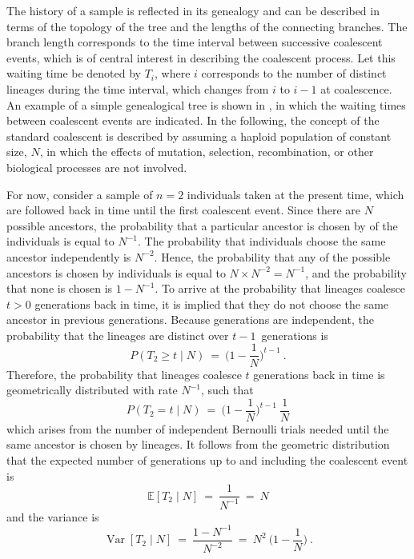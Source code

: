 %

%

The history of a sample is reflected in its genealogy and can be described in terms of the topology of the tree and the lengths of the connecting branches.
The branch length corresponds to the time interval between  successive coalescent events, which is of central interest in describing the coalescent process.
Let this waiting time be denoted by $T_i$, where $i$ corresponds to the number of distinct lineages during the time interval, which changes from $i$ to ${i-1}$ at coalescence.
An example of a simple genealogical tree is shown in , in which the waiting times between coalescent events are indicated.
In the following, the concept of the standard coalescent is described by assuming a haploid population of constant size, $N$, in which the effects of mutation, selection, recombination, or other biological processes are not involved.

For now, consider a sample of ${n=2}$ individuals taken at the present time, which are followed back in time until the first coalescent event.
Since there are $N$ possible ancestors, the probability that a particular ancestor is chosen by  of the individuals is equal to $N^{-1}$.
The probability that  individuals choose the same ancestor independently is $N^{-2}$.
Hence, the probability that any of the possible ancestors is chosen by  individuals is equal to ${N \times N^{-2} = N^{-1}}$, and the probability that none is chosen is ${1 - N^{-1}}$.
To arrive at the probability that  lineages coalesce $t>0$ generations back in time, it is implied that they do not choose the same ancestor in previous generations.
Because generations are independent, the probability that the  lineages are distinct over $t-1$~generations is
\begin{equation}
	P(T_2 \geq t \mid N) ~=~ \Big( 1 - \frac{1}{N} \Big)^{t-1}
	\ \text{.}
\end{equation}
Therefore, the probability that  lineages coalesce $t$ generations back in time is geometrically distributed with rate $N^{-1}$, such that
\begin{equation}\label{eq:coalprob}
	P(T_2 = t \mid N) ~=~ \Big( 1 - \frac{1}{N} \Big)^{t-1} ~ \frac{1}{N}
\end{equation}
which arises from the number of independent Bernoulli trials needed until the same ancestor is chosen by  lineages.
It follows from the geometric distribution that the expected number of generations up to and including the coalescent event is
\begin{equation}\label{eq:coal_2_exp}
	\mathbb{E}[T_2 \mid N] ~=~ \frac{1}{N^{-1}} ~=~ N
\end{equation}
and the variance is
\begin{equation}\label{eq:coal_2_var}
	\operatorname{Var}[T_2 \mid N] ~=~ \frac{1 - N^{-1}}{N^{-2}} ~=~ N^2 ~ \Big( 1 - \frac{1}{N} \Big)
	\ \text{.}
\end{equation}

